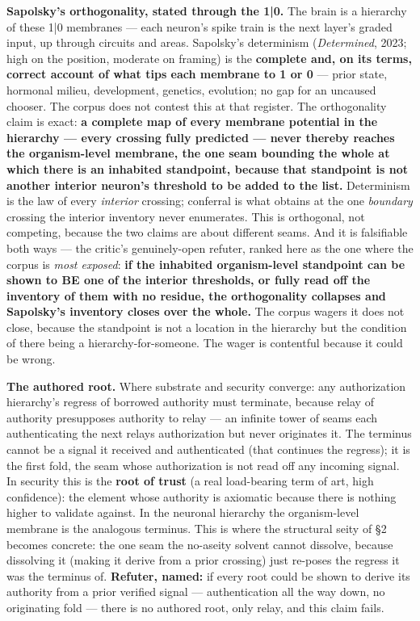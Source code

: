 \documentclass[11pt]{article}
\begin{document}
\textbf{Sapolsky's orthogonality, stated through the 1|0.} The brain is a hierarchy of these 1|0 membranes — each neuron's spike train is the next layer's graded input, up through circuits and areas. Sapolsky's determinism (\emph{Determined}, 2023; high on the position, moderate on framing) is the \textbf{complete and, on its terms, correct account of what tips each membrane to 1 or 0} — prior state, hormonal milieu, development, genetics, evolution; no gap for an uncaused chooser. The corpus does not contest this at that register. The orthogonality claim is exact: \textbf{a complete map of every membrane potential in the hierarchy — every crossing fully predicted — never thereby reaches the organism-level membrane, the one seam bounding the whole at which there is an inhabited standpoint, because that standpoint is not another interior neuron's threshold to be added to the list.} Determinism is the law of every \emph{interior} crossing; conferral is what obtains at the one \emph{boundary} crossing the interior inventory never enumerates. This is orthogonal, not competing, because the two claims are about different seams. And it is falsifiable both ways — the critic's genuinely-open refuter, ranked here as the one where the corpus is \emph{most exposed}: \textbf{if the inhabited organism-level standpoint can be shown to BE one of the interior thresholds, or fully read off the inventory of them with no residue, the orthogonality collapses and Sapolsky's inventory closes over the whole.} The corpus wagers it does not close, because the standpoint is not a location in the hierarchy but the condition of there being a hierarchy-for-someone. The wager is contentful because it could be wrong.

\textbf{The authored root.} Where substrate and security converge: any authorization hierarchy's regress of borrowed authority must terminate, because relay of authority presupposes authority to relay — an infinite tower of seams each authenticating the next relays authorization but never originates it. The terminus cannot be a signal it received and authenticated (that continues the regress); it is the first fold, the seam whose authorization is not read off any incoming signal. In security this is the \textbf{root of trust} (a real load-bearing term of art, high confidence): the element whose authority is axiomatic because there is nothing higher to validate against. In the neuronal hierarchy the organism-level membrane is the analogous terminus. This is where the structural seity of §2 becomes concrete: the one seam the no-aseity solvent cannot dissolve, because dissolving it (making it derive from a prior crossing) just re-poses the regress it was the terminus of. \textbf{Refuter, named:} if every root could be shown to derive its authority from a prior verified signal — authentication all the way down, no originating fold — there is no authored root, only relay, and this claim fails.
\end{document}
